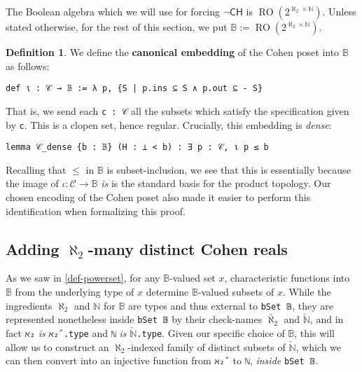 \documentclass[a4paper,USenglish,cleveref, autoref]{lipics-v2019}
\newcommand{\B}{\mathbb{B}}
\newcommand{\lil}{\lstinline}
\newcommand{\N}{\mathbb{N}}
\theoremstyle{definition}
\newtheorem{defn}[theorem]{Definition}
\begin{document}
The Boolean algebra which we will use for forcing $\neg\mathsf{CH}$ is $\operatorname{RO}(2^{\aleph_2 \times \mathbb{N}})$. Unless stated otherwise, for the rest of this section, we put $\B := \operatorname{RO}(2^{\aleph_2 \times \mathbb{N}})$.

\begin{defn}
  We define the \textbf{canonical embedding} of the Cohen poset into $\B$ as follows:
  \begin{lstlisting}
def ι : 𝒞 → 𝔹 := λ p, {S | p.ins ⊆ S ∧ p.out ⊆ - S}
\end{lstlisting}
\end{defn}
That is, we send each \lil{c : 𝒞} all the subsets which satisfy the specification given by \lil{c}. This is a clopen set, hence regular. Crucially, this embedding is \emph{dense}:
\begin{lstlisting}
lemma 𝒞_dense {b : 𝔹} (H : ⊥ < b) : ∃ p : 𝒞, ι p ≤ b
\end{lstlisting}
Recalling that $\leq$ in $\B$ is subset-inclusion, we see that this is essentially because the image of $\iota : \mathcal{C} \to \B$ \emph{is} is the standard basis for the product topology. Our chosen encoding of the Cohen poset also made it easier to perform this identification when formalizing this proof.
\subsection{Adding $\aleph_2$-many distinct Cohen reals} \label{subsect:cohen-reals}
As we saw in \autoref{def-powerset}, for any $\B$-valued set $x$, characteristic functions into $\B$ from the underlying type of $x$ determine $\B$-valued subsets of $x$. While the ingredients $\aleph_2$ and $\mathbb{N}$ for $\B$ are types and thus external to \lil{bSet 𝔹}, they are represented nonetheless inside \lil{bSet 𝔹} by their check-names $\check{\aleph_2}$ and $\check{\mathbb{N}}$, and in fact \lil{ℵ₂} \emph{is} \lil{ℵ₂̌ .type} and \lil{ℕ} \emph{is} $\check{\mathbb{N}}$\lil{.type}. Given our specific choice of $\B$, this will allow us to construct an $\aleph_2$-indexed family of distinct subsets of $\check{\N}$, which we can then convert into an injective function from \lil{ℵ₂̌ } to \lil{ℕ}, \emph{inside} \lil{bSet 𝔹}.
\end{document}
